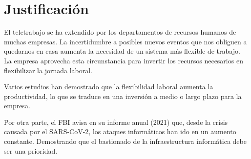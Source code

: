 \section{Justificación}

El teletrabajo se ha extendido por los departamentos de recursos humanos de muchas empresas. La incertidumbre a posibles nuevos eventos que nos obliguen a quedarnos en casa aumenta la necesidad de un sistema más flexible de trabajo. La empresa aprovecha esta circunstancia para invertir los recursos necesarios en flexibilizar la jornada laboral.

    
Varios estudios han demostrado que la flexibilidad laboral aumenta la productividad, lo que se traduce en una inversión a medio o largo plazo para la empresa.

Por otra parte, el FBI avisa en su informe anual (2021) que, desde la crisis causada por el SARS-CoV-2, los ataques informáticos han ido en un aumento constante. Demostrando que el bastionado de la infraestructura informática debe ser una prioridad.\cite{fbi2021ic3}